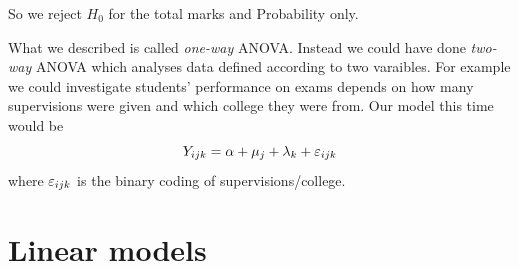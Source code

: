\documentclass{article}
\begin{document}
\begin{example}
\begin{center}
\begin{tabular}{|c | c c c c|}
    \hline
  \end{tabular}
\end{center}
So we reject $ H_0 $ for the total marks and Probability only.
\begin{remark}
	What we described is called \textit{one-way} ANOVA. Instead we could have done \textit{two-way} ANOVA which analyses data defined according to two varaibles. For example we could investigate students' performance on exams depends on how many supervisions were given and which college they were from. Our model this time would be
	\[
		Y_{ijk}= \alpha + \mu_j + \lambda_k + \varepsilon_{ijk}
	\]
	where $ \varepsilon_{ijk} $ is the binary coding of supervisions/college.
\end{remark}
\end{example}
\section{Linear models}
\end{document}

